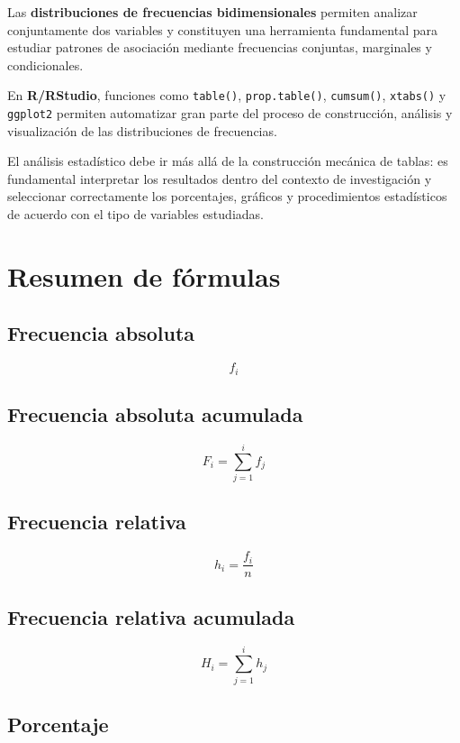 \documentclass[
  spanish,
  14pt,
  letterpaper,
  DIV=11,
  numbers=noendperiod]{scrartcl}
\begin{document}
Las \textbf{distribuciones de frecuencias bidimensionales} permiten
analizar conjuntamente dos variables y constituyen una herramienta
fundamental para estudiar patrones de asociación mediante frecuencias
conjuntas, marginales y condicionales.

En \textbf{R/RStudio}, funciones como \texttt{table()},
\texttt{prop.table()}, \texttt{cumsum()}, \texttt{xtabs()} y
\texttt{ggplot2} permiten automatizar gran parte del proceso de
construcción, análisis y visualización de las distribuciones de
frecuencias.

El análisis estadístico debe ir más allá de la construcción mecánica de
tablas: es fundamental interpretar los resultados dentro del contexto de
investigación y seleccionar correctamente los porcentajes, gráficos y
procedimientos estadísticos de acuerdo con el tipo de variables
estudiadas.

\section{Resumen de fórmulas}\label{resumen-de-fuxf3rmulas}

\subsection{Frecuencia absoluta}\label{frecuencia-absoluta-1}

\[
f_i
\]

\subsection{Frecuencia absoluta
acumulada}\label{frecuencia-absoluta-acumulada-1}

\[
F_i=\sum_{j=1}^{i}f_j
\]

\subsection{Frecuencia relativa}\label{frecuencia-relativa-1}

\[
h_i=\frac{f_i}{n}
\]

\subsection{Frecuencia relativa
acumulada}\label{frecuencia-relativa-acumulada-1}

\[
H_i=\sum_{j=1}^{i}h_j
\]

\subsection{Porcentaje}\label{porcentaje}
\end{document}
